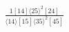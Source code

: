 \documentclass[varwidth, border=5pt]{standalone}
\begin{document}
\begin{my}
$\begin{gathered}
\scriptscriptstyle\frac{1[14]⟨25⟩^2[24]}{⟨14⟩[15]⟨35⟩^2[45]}
\end{gathered}$
\end{my}
\end{document}
